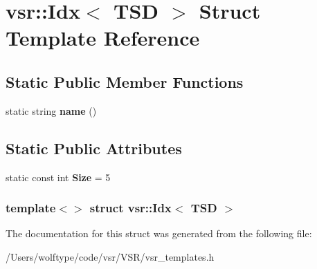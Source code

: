 \hypertarget{structvsr_1_1_idx_3_01_t_s_d_01_4}{\section{vsr\-:\-:Idx$<$ T\-S\-D $>$ Struct Template Reference}
\label{structvsr_1_1_idx_3_01_t_s_d_01_4}
}
\subsection*{Static Public Member Functions}
\begin{DoxyCompactItemize}
\item 
\hypertarget{structvsr_1_1_idx_3_01_t_s_d_01_4_a37cf098ecb0e63cc1057ce504cb8f0e7}{static string {\bfseries name} ()}\label{structvsr_1_1_idx_3_01_t_s_d_01_4_a37cf098ecb0e63cc1057ce504cb8f0e7}

\end{DoxyCompactItemize}
\subsection*{Static Public Attributes}
\begin{DoxyCompactItemize}
\item 
\hypertarget{structvsr_1_1_idx_3_01_t_s_d_01_4_a5aeb3544c85ff939e9dcdad50d5eacc6}{static const int {\bfseries Size} = 5}\label{structvsr_1_1_idx_3_01_t_s_d_01_4_a5aeb3544c85ff939e9dcdad50d5eacc6}

\end{DoxyCompactItemize}
\subsubsection*{template$<$$>$ struct vsr\-::\-Idx$<$ T\-S\-D $>$}



The documentation for this struct was generated from the following file\-:\begin{DoxyCompactItemize}
\item 
/\-Users/wolftype/code/vsr/\-V\-S\-R/vsr\-\_\-templates.\-h\end{DoxyCompactItemize}

